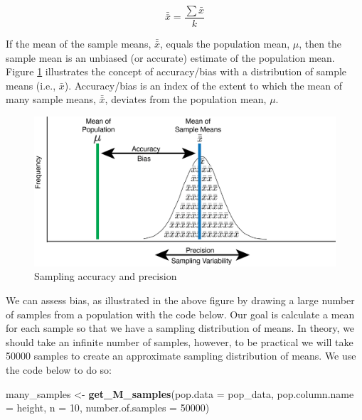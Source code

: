\documentclass[
]{krantz}
\makeatletter
\newenvironment{Shaded}{\begin{snugshade}}{\end{snugshade}}
\newcommand{\DataTypeTok}[1]{\textcolor[rgb]{0.27,0.27,0.27}{#1}}
\newcommand{\DecValTok}[1]{\textcolor[rgb]{0.06,0.06,0.06}{#1}}
\newcommand{\KeywordTok}[1]{\textcolor[rgb]{0.27,0.27,0.27}{\textbf{#1}}}
\newcommand{\NormalTok}[1]{#1}
\newcommand{\StringTok}[1]{\textcolor[rgb]{0.5,0.5,0.5}{#1}}
\newenvironment{kframe}{%
\medskip{}
\setlength{\fboxsep}{.8em}
 \def\at@end@of@kframe{}%
 \ifinner\ifhmode%
  \def\at@end@of@kframe{\end{minipage}}%
  \begin{minipage}{\columnwidth}%
 \fi\fi%
 \def\FrameCommand##1{\hskip\@totalleftmargin \hskip-\fboxsep
 \colorbox{shadecolor}{##1}\hskip-\fboxsep
     \hskip-\linewidth \hskip-\@totalleftmargin \hskip\columnwidth}%
 \MakeFramed {\advance\hsize-\width
   \@totalleftmargin\z@ \linewidth\hsize
   \@setminipage}}%
 {\par\unskip\endMakeFramed%
 \at@end@of@kframe}
\renewenvironment{Shaded}{\begin{kframe}}{\end{kframe}}
\makeatother
\begin{document}
\begin{equation} 
\bar{\bar{x}} = \frac{\sum{\bar{x}}}{k}
      \label{eq:samplemeanmeanch5}
\end{equation}

If the mean of the sample means, \(\bar{\bar{x}}\), equals the population mean, \(\mu\), then the sample mean is an unbiased (or accurate) estimate of the population mean. Figure \ref{fig:showbias} illustrates the concept of accuracy/bias with a distribution of sample means (i.e., \(\bar{x}\)). Accuracy/bias is an index of the extent to which the mean of many sample means, \(\bar{\bar{x}}\), deviates from the population mean, \(\mu\).

\begin{figure}
\includegraphics[width=0.8\linewidth]{ch_samples/images/sampling_accuracy} \caption{Sampling accuracy and precision}\label{fig:showbias}
\end{figure}

We can assess bias, as illustrated in the above figure by drawing a large number of samples from a population with the code below. Our goal is calculate a mean for each sample so that we have a sampling distribution of means. In theory, we should take an infinite number of samples, however, to be practical we will take 50000 samples to create an approximate sampling distribution of means. We use the code below to do so:

\begin{Shaded}
\begin{Highlighting}[]
\NormalTok{many_samples <-}\StringTok{ }\KeywordTok{get_M_samples}\NormalTok{(}\DataTypeTok{pop.data =}\NormalTok{ pop_data, }
                              \DataTypeTok{pop.column.name =}\NormalTok{ height,}
                              \DataTypeTok{n =} \DecValTok{10}\NormalTok{,}
                              \DataTypeTok{number.of.samples =} \DecValTok{50000}\NormalTok{)}
\end{Highlighting}
\end{Shaded}
\end{document}

